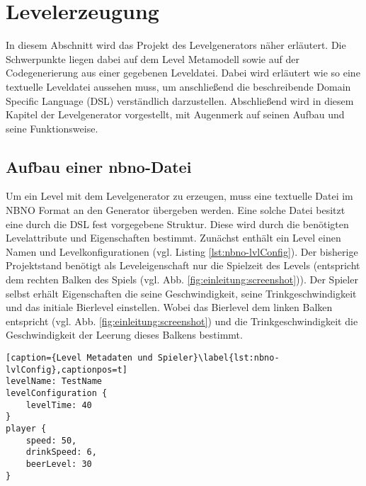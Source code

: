 \section{Levelerzeugung}\label{sec:levelerzeugung}

In diesem Abschnitt wird das Projekt des Levelgenerators näher erläutert. Die Schwerpunkte liegen dabei auf dem Level Metamodell sowie auf der Codegenerierung aus einer gegebenen Leveldatei. \newline 
Dabei wird erläutert wie so eine textuelle Leveldatei aussehen muss, um anschließend die beschreibende Domain Specific Language (DSL) verständlich darzustellen.\newline
Abschließend wird in diesem Kapitel der Levelgenerator vorgestellt, mit Augenmerk auf seinen Aufbau und seine Funktionsweise.

\subsection{Aufbau einer nbno-Datei}
Um ein Level mit dem Levelgenerator zu erzeugen, muss eine textuelle Datei im NBNO Format an den Generator übergeben werden. Eine solche Datei besitzt eine durch die DSL fest vorgegebene Struktur. Diese wird durch die benötigten Levelattribute und Eigenschaften bestimmt.\newline
Zunächst enthält ein Level einen Namen und Levelkonfigurationen (vgl. Listing \ref{lst:nbno-lvlConfig}). Der bisherige Projektstand benötigt als Leveleigenschaft nur die Spielzeit des Levels (entspricht dem rechten Balken des Spiels (vgl. Abb. \ref{fig:einleitung:screenshot})).\newline
Der Spieler selbst erhält Eigenschaften die seine Geschwindigkeit, seine Trinkgeschwindigkeit und das initiale Bierlevel einstellen. Wobei das Bierlevel dem linken Balken entspricht (vgl. Abb. \ref{fig:einleitung:screenshot}) und die Trinkgeschwindigkeit die Geschwindigkeit der Leerung dieses Balkens bestimmt.

\begin{lstlisting}[caption={Level Metadaten und Spieler}\label{lst:nbno-lvlConfig},captionpos=t] 
levelName: TestName
levelConfiguration {
    levelTime: 40
}
player {
    speed: 50,
    drinkSpeed: 6,
    beerLevel: 30
}
\end{lstlisting}

